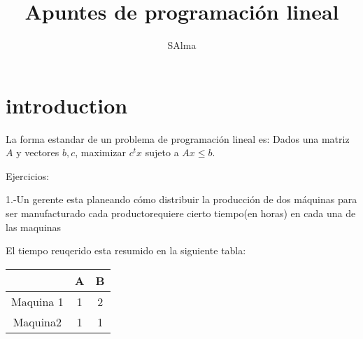 \documentclass{article}
\title{Apuntes de programación lineal}
\author{SAlma}
\begin{document}
\maketitle
\tableofcontents
\section{introduction}

\label{sec:introduction}

La forma estandar de un problema de programación lineal es:
Dados una matriz $A$ y vectores $b,c$, maximizar $c^tx$ sujeto a
$Ax\leq b$.

Ejercicios:

1.-Un gerente esta planeando cómo distribuir la producción de dos
máquinas para ser manufacturado cada productorequiere cierto tiempo(en
horas) en cada una de las maquinas

El tiempo reuqerido esta resumido en la siguiente tabla:

\begin{tabular}{|c|c|c|}
  \hline
  &A&B\\
  \hline
  Maquina 1&1&2\\
  \hline
  Maquina2&1&1\\
  \hline      
\end{tabular}
\end{document}
